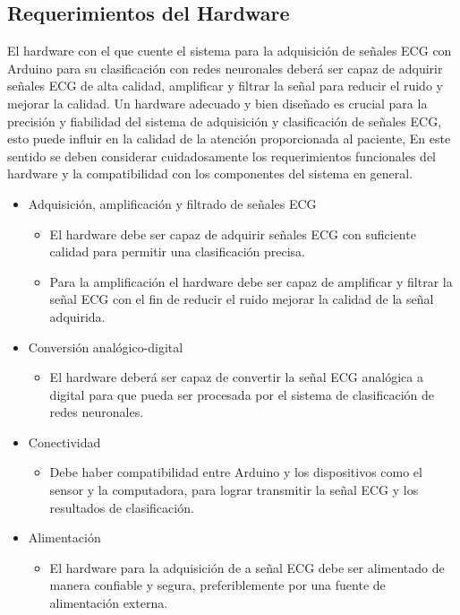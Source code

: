 \subsection{Requerimientos del Hardware}
El hardware con el que cuente el sistema para la adquisición de señales ECG con Arduino para su  clasificación con redes neuronales deberá ser capaz de adquirir señales ECG de alta calidad,  amplificar y filtrar la señal para reducir el ruido y mejorar la calidad. Un hardware adecuado y bien diseñado es crucial para la precisión y fiabilidad del sistema de adquisición y clasificación de señales ECG, esto puede influir en la calidad de la atención proporcionada al paciente, En este sentido se deben considerar cuidadosamente los requerimientos funcionales del hardware y la compatibilidad con los componentes del sistema en general.\\

\begin{itemize}
    \item Adquisición, amplificación y filtrado de señales ECG
          \begin{itemize}
              \item El hardware debe ser capaz de adquirir señales ECG con suficiente calidad para
                    permitir una clasificación precisa.
              \item Para la amplificación el hardware debe ser capaz de amplificar y filtrar la señal
                    ECG con el fin de reducir el ruido mejorar la calidad de la señal adquirida.
          \end{itemize}
    \item Conversión analógico-digital
          \begin{itemize}
              \item El hardware deberá ser capaz de convertir la señal ECG analógica a digital para
                    que pueda ser procesada por el sistema de clasificación de redes neuronales.
          \end{itemize}
    \item Conectividad
          \begin{itemize}
              \item Debe haber compatibilidad entre Arduino y los dispositivos como el sensor y la computadora, para lograr transmitir la señal ECG y los resultados de clasificación.
          \end{itemize}
    \item Alimentación
          \begin{itemize}
              \item El hardware para la adquisición de a señal ECG debe ser alimentado de manera confiable y segura, preferiblemente por una fuente de alimentación externa.
          \end{itemize}
\end{itemize}

